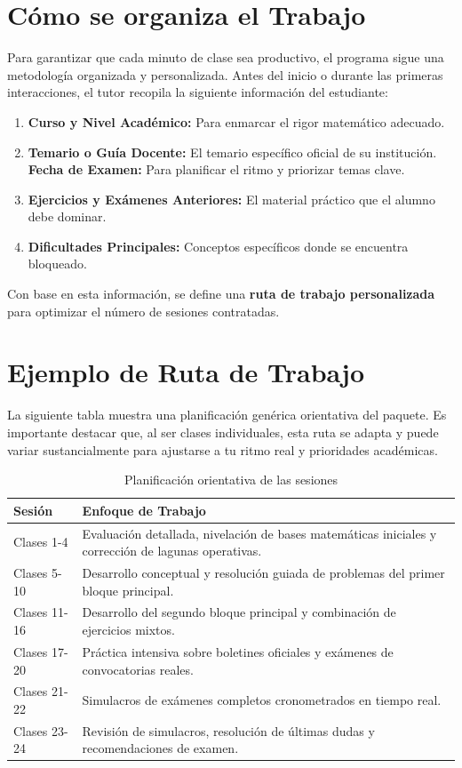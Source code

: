 \documentclass[11pt,a4paper]{article}
\begin{document}
\newpage
\section{Cómo se organiza el Trabajo}
Para garantizar que cada minuto de clase sea productivo, el programa sigue una metodología organizada y personalizada. Antes del inicio o durante las primeras interacciones, el tutor recopila la siguiente información del estudiante:
\begin{enumerate}
    \item \textbf{Curso y Nivel Académico:} Para enmarcar el rigor matemático adecuado.
    \item \textbf{Temario o Guía Docente:} El temario específico oficial de su institución.
    \textbf{Fecha de Examen:} Para planificar el ritmo y priorizar temas clave.
    \item \textbf{Ejercicios y Exámenes Anteriores:} El material práctico que el alumno debe dominar.
    \item \textbf{Dificultades Principales:} Conceptos específicos donde se encuentra bloqueado.
\end{enumerate}
Con base en esta información, se define una \textbf{ruta de trabajo personalizada} para optimizar el número de sesiones contratadas.

\section{Ejemplo de Ruta de Trabajo}
La siguiente tabla muestra una planificación genérica orientativa del paquete. Es importante destacar que, al ser clases individuales, esta ruta se adapta y puede variar sustancialmente para ajustarse a tu ritmo real y prioridades académicas.

\begin{table}[h]
\centering
\renewcommand{\arraystretch}{1.3}
\begin{tabular}{|l|p{11cm}|}
\hline
\rowcolor{primary}
\color{white}\textbf{Sesión} & \color{white}\textbf{Enfoque de Trabajo} \\ \hline
 Clases 1-4 & Evaluación detallada, nivelación de bases matemáticas iniciales y corrección de lagunas operativas. \\ \hline
 Clases 5-10 & Desarrollo conceptual y resolución guiada de problemas del primer bloque principal. \\ \hline
 Clases 11-16 & Desarrollo del segundo bloque principal y combinación de ejercicios mixtos. \\ \hline
 Clases 17-20 & Práctica intensiva sobre boletines oficiales y exámenes de convocatorias reales. \\ \hline
 Clases 21-22 & Simulacros de exámenes completos cronometrados en tiempo real. \\ \hline
 Clases 23-24 & Revisión de simulacros, resolución de últimas dudas y recomendaciones de examen. \\ \hline
\end{tabular}
\caption{Planificación orientativa de las sesiones}
\end{table}
\end{document}
